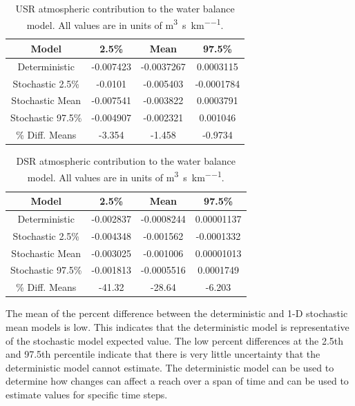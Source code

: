 \begin{linenumbers}
\begin{table}[htbp]
\centering
\caption[USR atmospheric contribution to the water balance model.]{USR atmospheric contribution to the water balance model.  All values are in units of \si{\cubic\meter\per\second\per\kilo\meter}. }
\label{tab:USRWaterAtm}
\begin{tabular}{c|ccc}
	\toprule
	Model& 2.5\% & Mean & 97.5\% \\
	\midrule
	\midrule
	Deterministic    &	-0.007423&	-0.0037267&	0.0003115\\
	\midrule                                               
	Stochastic 2.5\% &	-0.0101&	-0.005403&	-0.0001784\\
	Stochastic Mean  &	-0.007541&	-0.003822&	0.0003791\\ 
	Stochastic 97.5\%&	-0.004907&	-0.002321&	0.001046\\  
	\midrule                                               
	\% Diff. Means&		-3.354&	-1.458&	-0.9734\\
	\bottomrule
\end{tabular}
\end{table}

\begin{table}[htbp]
\centering
\caption[DSR atmospheric contribution to the water balance model.]{DSR atmospheric contribution to the water balance model.  All values are in units of \si{\cubic\meter\per\second\per\kilo\meter}.}
\label{tab:DSRWaterAtm}
\begin{tabular}{c|ccc}
	\toprule
	Model& 2.5\% & Mean & 97.5\% \\
	\midrule
	\midrule
	Deterministic    &	-0.002837&	-0.0008244&	0.00001137\\
	\midrule                                              
	Stochastic 2.5\% &	-0.004348&	-0.001562&	-0.0001332\\
	Stochastic Mean  &	-0.003025&	-0.001006&	0.00001013\\
	Stochastic 97.5\%&	-0.001813&	-0.0005516&	0.0001749\\ 
	\midrule                                              
	\% Diff. Means&		-41.32&	-28.64&	-6.203\\
	\bottomrule
\end{tabular}
\end{table}

The mean of the percent difference between the deterministic and 1-D stochastic mean models is low.  This indicates that the deterministic model is representative of the stochastic model expected value.  The low percent differences at the 2.5th and 97.5th percentile indicate that there is very little uncertainty that the deterministic model cannot estimate.  The deterministic model can be used to determine how changes can affect a reach over a span of time and can be used to estimate values for specific time steps.


\end{linenumbers}

